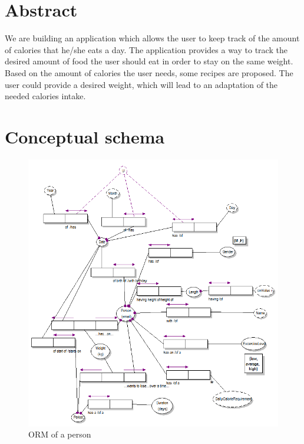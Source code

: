 






\maketitlepage

\section{Abstract}
We are building an application which allows the user to keep track of the amount of calories that he/she eats a day.  The application provides a way to track the desired amount of food the user should eat in order to stay on the same weight. Based on the amount of calories the user needs, some recipes are proposed. The user could provide a desired weight, which will lead to an adaptation of the needed calories intake.

\newpage

\section{Conceptual schema}



  \begin{figure} [h!]
     \includegraphics[width = 1.3\textwidth]{image/Person} 
     \caption{ORM of a person}
     \label{fig:twotier}
  \end{figure}


